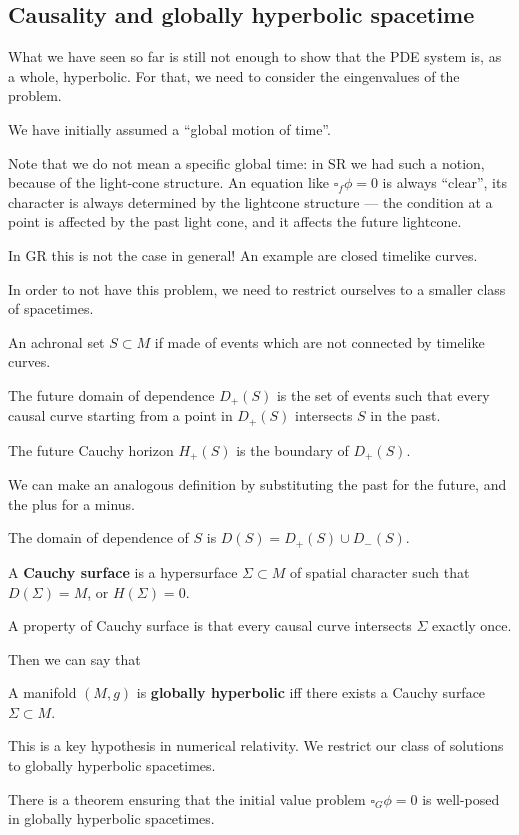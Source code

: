 \documentclass[main.tex]{subfiles}
\begin{document}
\subsection{Causality and globally hyperbolic spacetime}

What we have seen so far is still not enough to show that the PDE system is, as a whole, hyperbolic. For that, we need to consider the eingenvalues of the problem. 

We have initially assumed a ``global motion of time''. 

Note that we do not mean a specific global time: in SR we had such a notion, because of the light-cone structure. 
An equation like \(\square_f \phi = 0\) is always ``clear'', its character is always determined by the lightcone structure --- the condition at a point is affected by the past light cone, and it affects the future lightcone.

In GR this is not the case in general! 
An example are closed timelike curves. 

In order to not have this problem, we need to restrict ourselves to a smaller class of spacetimes. 

\begin{definition}
An achronal set \(S \subset M\) if made of events which are not connected by timelike curves. 
\end{definition}

\begin{definition}
The future domain of dependence \(D_+ (S)\) is the set of events such that every causal curve starting from a point in \(D_+ (S)\) intersects \(S\) in the past.
\end{definition}

\begin{definition}
The future Cauchy horizon \(H_+ (S)\) is the boundary of \(D_+ (S)\). 
\end{definition}

We can make an analogous definition by substituting the past for the future, and the plus for a minus. 

\begin{definition}
The domain of dependence of \(S\) is \(D(S) = D_+ (S) \cup D_- (S)\). 
\end{definition}

\begin{definition}
A \textbf{Cauchy surface} is a hypersurface \(\Sigma \subset M\) of spatial character such that \(D(\Sigma ) = M\), or \(H(\Sigma ) = 0\).  
\end{definition}

A property of Cauchy surface is that every causal curve intersects \(\Sigma \) exactly once. 

Then we can say that 
\begin{definition}
A manifold \((M, g)\) is \textbf{globally hyperbolic} iff there exists a Cauchy surface \(\Sigma \subset M\). 
\end{definition}

This is a key hypothesis in numerical relativity. 
We restrict our class of solutions to globally hyperbolic spacetimes. 

There is a theorem ensuring that the initial value problem \(\square_G \phi  = 0 \) is well-posed in globally hyperbolic spacetimes. 
\end{document}
